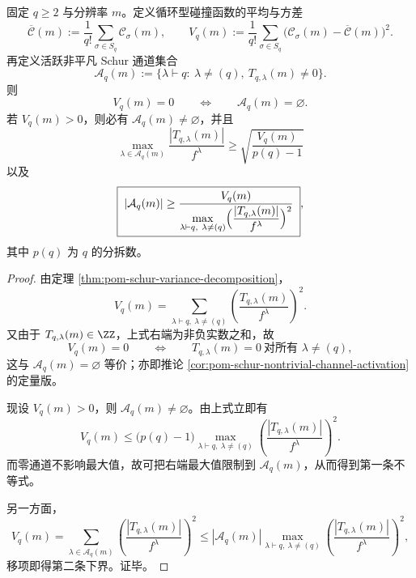 \begin{theorem}\label{thm:xi-time-part63-schur-variance-forcing-support-lower-bound}
固定 \(q\ge 2\) 与分辨率 \(m\)。定义循环型碰撞函数的平均与方差
\[
\overline{\mathcal C}(m):=\frac{1}{q!}\sum_{\sigma\in S_q}\mathcal C_\sigma(m),
\qquad
V_q(m):=\frac{1}{q!}\sum_{\sigma\in S_q}
\bigl(\mathcal C_\sigma(m)-\overline{\mathcal C}(m)\bigr)^2.
\]
再定义活跃非平凡 Schur 通道集合
\[
\mathcal A_q(m):=
\{\lambda\vdash q:\ \lambda\neq(q),\ T_{q,\lambda}(m)\neq 0\}.
\]
则
\[
V_q(m)=0
\qquad\Longleftrightarrow\qquad
\mathcal A_q(m)=\varnothing.
\]
若 \(V_q(m)>0\)，则必有 \(\mathcal A_q(m)\neq\varnothing\)，并且
\[
\boxed{\;
\max_{\lambda\in\mathcal A_q(m)}
\frac{|T_{q,\lambda}(m)|}{f^\lambda}
\ge
\sqrt{\frac{V_q(m)}{p(q)-1}}\;}
\]
以及
\[
\boxed{\;
|\mathcal A_q(m)|
\ge
\frac{V_q(m)}
{\displaystyle
\max_{\lambda\vdash q,\ \lambda\neq(q)}
\Bigl(\frac{|T_{q,\lambda}(m)|}{f^\lambda}\Bigr)^2}\; } ,
\]
其中 \(p(q)\) 为 \(q\) 的分拆数。
\end{theorem}
\begin{proof}
由定理 \ref{thm:pom-schur-variance-decomposition}，
\[
V_q(m)
=
\sum_{\lambda\vdash q,\ \lambda\neq(q)}
\left(\frac{T_{q,\lambda}(m)}{f^\lambda}\right)^2.
\]
又由于 \(T_{q,\lambda}(m)\in\ZZ\)，上式右端为非负实数之和，故
\[
V_q(m)=0
\qquad\Longleftrightarrow\qquad
T_{q,\lambda}(m)=0\ \text{对所有 }\lambda\neq(q),
\]
这与 \(\mathcal A_q(m)=\varnothing\) 等价；亦即推论
\ref{cor:pom-schur-nontrivial-channel-activation}
的定量版。

现设 \(V_q(m)>0\)，则 \(\mathcal A_q(m)\neq\varnothing\)。由上式立即有
\[
V_q(m)
\le
\bigl(p(q)-1\bigr)
\max_{\lambda\vdash q,\ \lambda\neq(q)}
\left(\frac{|T_{q,\lambda}(m)|}{f^\lambda}\right)^2.
\]
而零通道不影响最大值，故可把右端最大值限制到 \(\mathcal A_q(m)\)，从而得到第一条不等式。

另一方面，
\[
V_q(m)
=
\sum_{\lambda\in\mathcal A_q(m)}
\left(\frac{|T_{q,\lambda}(m)|}{f^\lambda}\right)^2
\le
|\mathcal A_q(m)|
\max_{\lambda\vdash q,\ \lambda\neq(q)}
\left(\frac{|T_{q,\lambda}(m)|}{f^\lambda}\right)^2,
\]
移项即得第二条下界。证毕。
\end{proof}

